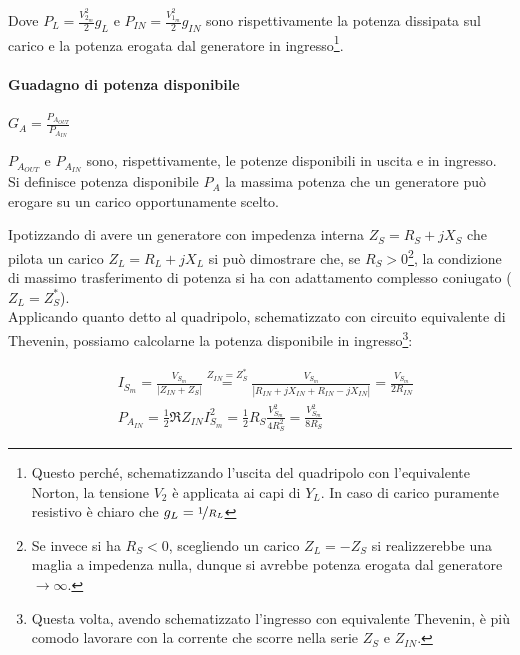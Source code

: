 Dove $P_L = \frac{V_{2_m}^2}{2}g_L$ e $P_{IN} = \frac{V_{1_m}^2}{2} g_{IN}$ sono rispettivamente la potenza dissipata sul carico e la potenza erogata dal generatore in ingresso\footnote{Questo perché, schematizzando l'uscita del quadripolo con l'equivalente Norton, la tensione $V_2$ è applicata ai capi di $Y_L$. In caso di carico puramente resistivo è chiaro che $g_L = \nicefrac{1}{R_L}$}.



\paragraph{Guadagno di potenza disponibile} $G_A = \frac{P_{A_{OUT}}}{P_{A_{IN}}}$

$P_{A_{OUT}}$ e $P_{A_{IN}}$ sono, rispettivamente, le potenze disponibili in uscita e in ingresso.
Si definisce potenza disponibile $P_A$ la massima potenza che un generatore può erogare su un carico opportunamente scelto.

Ipotizzando di avere un generatore con impedenza interna $Z_S = R_S + jX_S$ che pilota un carico $Z_L = R_L + jX_L$ si può dimostrare che, se $R_S > 0$\footnote{Se invece si ha $R_S < 0$, scegliendo un carico $Z_L = - Z_S$ si realizzerebbe una maglia a impedenza nulla, dunque si avrebbe potenza erogata dal generatore $\rightarrow \infty$.}, la condizione di massimo trasferimento di potenza si ha con adattamento complesso coniugato ($Z_L = Z^*_S$).\\

Applicando quanto detto al quadripolo, schematizzato con circuito equivalente di Thevenin, possiamo calcolarne la potenza disponibile in ingresso\footnote{Questa volta, avendo schematizzato l'ingresso con equivalente Thevenin, è più comodo lavorare con la corrente che scorre nella serie $Z_S$ e $Z_{IN}$.}:

$$\begin{aligned}
&I_{S_m} = \frac{V_{S_m}}{|Z_{IN} + Z_S|} \overset{Z_{IN} = Z_{S}^*}{=} \frac{V_{S_m}}{|R_{IN} + jX_{IN} + R_{IN} - jX_{IN}|} = \frac{V_{S_m}}{2R_{IN}}\\
&P_{A_{IN}} = \frac{1}{2} \Re{Z_{IN}} I_{S_m}^2 =
\frac{1}{2} R_{S} \frac{V_{S_m}^2}{4R_{S}^2} =
\frac{V_{S_m}^2}{8 R_S}
\end{aligned}$$

